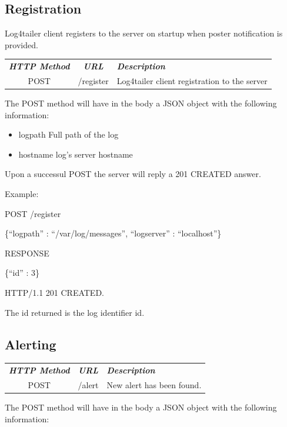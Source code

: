 \subsection{Registration}

Log4tailer client registers to the server on startup when poster notification is provided.

\begin{flushleft}
 \begin{tabular}{|c|c|l|}
 \hline 
 \rowcolor{cyan} {\color{white} \textit{\textbf{HTTP Method}}} &  {\color{white} 
  \textit{\textbf{URL}}}  & {\color{white} 
 \textit{\textbf{Description}}}\\
 POST & /register & Log4tailer client registration to the server\\
 \hline
\end{tabular}
\end{flushleft}
The POST method will have in the body a JSON object with the following information:

\begin{itemize}
 \item logpath Full path of the log 
 \item hostname log's server hostname
\end{itemize}

\noindent
Upon a successul POST the server will reply a 201 CREATED answer.

\noindent
Example:

\begin{codeexample}

POST /register

 \{``logpath'' : ``/var/log/messages'', ``logserver'' : ``localhost''\} 

RESPONSE

 \{``id'' : 3\} 

HTTP/1.1 201 CREATED.
\end{codeexample}

The id returned is the log identifier id.

\subsection{Alerting}

\begin{flushleft}
 \begin{tabular}{|c|c|l|}
 \hline 
 \rowcolor{cyan} {\color{white} \textit{\textbf{HTTP Method}}} &  {\color{white} 
  \textit{\textbf{URL}}}  & {\color{white} 
 \textit{\textbf{Description}}}\\
 POST & /alert & New alert has been found.\\
 \hline
\end{tabular}
\end{flushleft}
The POST method will have in the body a JSON object with the following information:


